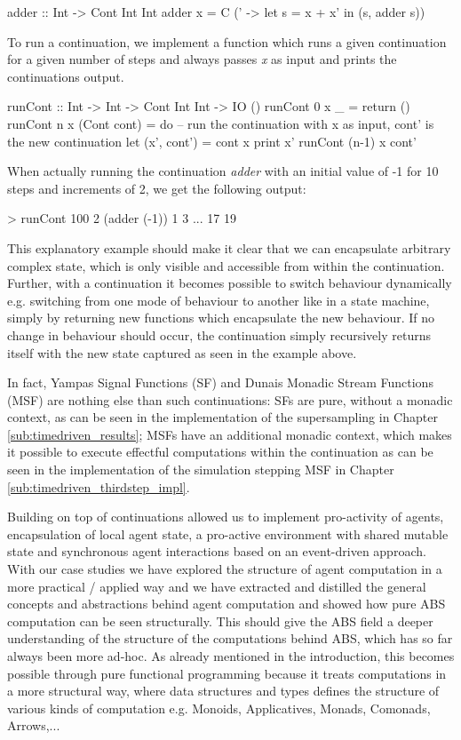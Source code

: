 \begin{HaskellCode}
adder :: Int -> Cont Int Int
adder x = C (\x' -> let s = x + x' in
                    (s, adder s))
\end{HaskellCode}

To run a continuation, we implement a function which runs a given continuation for a given number of steps and always passes \textit{x} as input and prints the continuations output.

\begin{HaskellCode}
runCont :: Int -> Int -> Cont Int Int -> IO ()
runCont 0 x _ = return () 
runCont n x (Cont cont) = do 
  -- run the continuation with x as input, cont' is the new continuation
  let (x', cont') = cont x
  print x'
  runCont (n-1) x cont' 
\end{HaskellCode}

When actually running the continuation \textit{adder} with an initial value of -1 for 10 steps and increments of 2, we get the following output:

\begin{HaskellCode}
> runCont 100 2 (adder (-1))
1
3
...
17
19
\end{HaskellCode}

This explanatory example should make it clear that we can encapsulate arbitrary complex state, which is only visible and accessible from within the continuation. Further, with a continuation it becomes possible to switch behaviour dynamically e.g. switching from one mode of behaviour to another like in a state machine, simply by returning new functions which encapsulate the new behaviour. If no change in behaviour should occur, the continuation simply recursively returns itself with the new state captured as seen in the example above.

In fact, Yampas Signal Functions (SF) and Dunais Monadic Stream Functions (MSF) are nothing else than such continuations: SFs are pure, without a monadic context, as can be seen in the implementation of the supersampling in Chapter \ref{sub:timedriven_results}; MSFs have an additional monadic context, which makes it possible to execute effectful computations within the continuation as can be seen in the implementation of the simulation stepping MSF in Chapter \ref{sub:timedriven_thirdstep_impl}. 

Building on top of continuations allowed us to implement pro-activity of agents, encapsulation of local agent state, a pro-active environment with shared mutable state and synchronous agent interactions based on an event-driven approach. With our case studies we have explored the structure of agent computation in a more practical / applied way and we have extracted and distilled the general concepts and abstractions behind agent computation and showed how pure ABS computation can be seen structurally. This should give the ABS field a deeper understanding of the structure of the computations behind ABS, which has so far always been more ad-hoc. As already mentioned in the introduction, this becomes possible through pure functional programming because it treats computations in a more structural way, where data structures and types defines the structure of various kinds of computation e.g. Monoids, Applicatives, Monads, Comonads, Arrows,...

